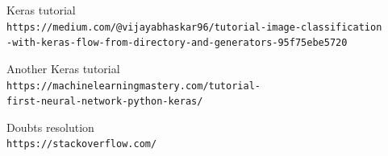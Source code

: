 \documentclass[12pt,spanish]{article}
\begin{document}
\begin{thebibliography}{9}
Keras tutorial
\\\texttt{https://medium.com/@vijayabhaskar96/tutorial-image-classification\\-with-keras-flow-from-directory-and-generators-95f75ebe5720}

Another Keras tutorial
\\\texttt{https://machinelearningmastery.com/tutorial-\\first-neural-network-python-keras/}

Doubts resolution
\\\texttt{https://stackoverflow.com/}

\end{thebibliography}
\end{document}
